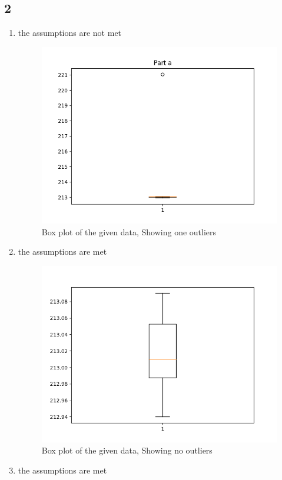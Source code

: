 \documentclass[12pt]{report}
\begin{document}
\subsection*{2}
   \begin{enumerate}[label={\bf \alph*}]
   \item the assumptions are not met
   \begin{figure}[H]
	\begin{center}
		\includegraphics[width=.70\textwidth]{HW12boxplot.png}
	\end{center}
	\caption{Box plot of the given data, Showing one outliers}
   \label{fig:3}
   \end{figure}
 \item the assumptions are met
 \begin{figure}[H]
	\begin{center}
		\includegraphics[width=.70\textwidth]{HW12boxplot2.png}
	\end{center}
	\caption{Box plot of the given data, Showing no outliers}
   \label{fig:3}
   \end{figure}
\item the assumptions are met
\begin{figure}[H]

\end{figure}
\end{enumerate}
\end{document}
